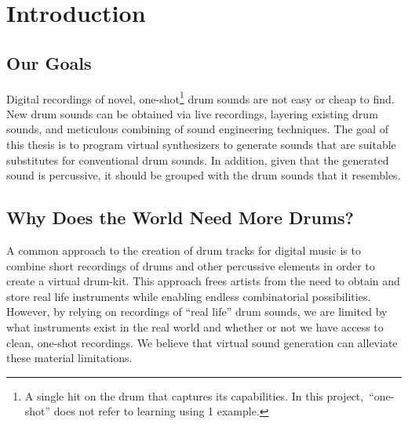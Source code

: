 \documentclass[\main/thesis.tex]{subfiles}
\begin{document}
\chapter{Introduction}


\section{Our Goals}
Digital recordings of novel, one-shot\footnote{A single hit on the drum that captures its capabilities. In this project,~\enquote{one-shot} does not refer to learning using 1 example.} drum sounds are not easy or cheap to find. New drum sounds can be obtained via live recordings, layering existing drum sounds, and meticulous combining of sound engineering techniques. The goal of this thesis is to program virtual synthesizers to generate sounds that are suitable substitutes for conventional drum sounds. In addition, given that the generated sound is percussive, it should be grouped with the drum sounds that it resembles.


\section{Why Does the World Need More Drums?}

A common approach to the creation of drum tracks for digital music is to combine short recordings of drums and other percussive elements in order to create a virtual drum-kit. This approach frees artists from the need to obtain and store real life instruments while enabling endless combinatorial possibilities. However, by relying on recordings of \enquote{real life} drum sounds, we are limited by what instruments exist in the real world and whether or not we have access to clean, one-shot recordings. We believe that virtual sound generation can alleviate these material limitations. 
 
\end{document}
